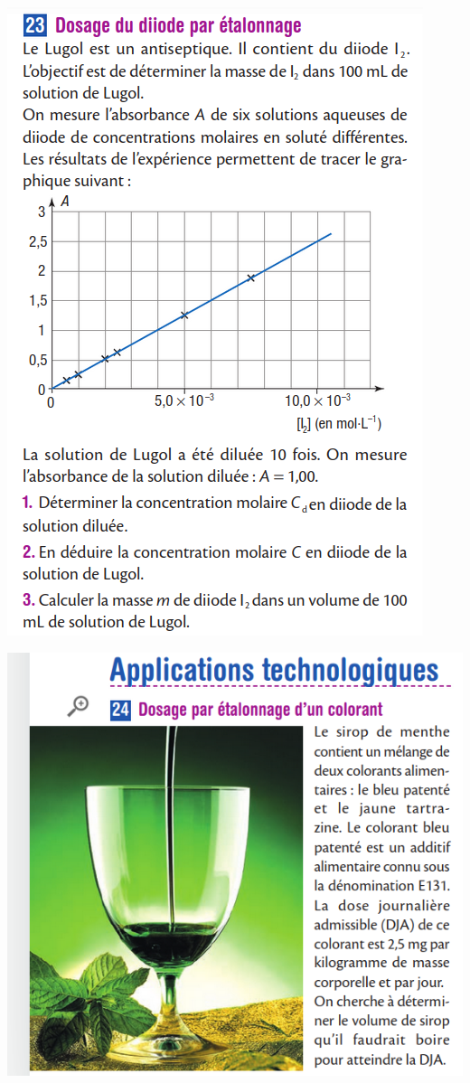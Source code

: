 \documentclass[10pt]{article}
\newcommand{\myscale}{0.41}
\begin{document}
\begin{center}
\begin{minipage}[c]{0.45\textwidth}
		\includegraphics[scale=\myscale]{assets/23.png}




	\end{minipage}


	\begin{minipage}[c]{0.45\textwidth}
		\centering
		\includegraphics[scale=\myscale]{assets/24a.png}


\end{minipage}
\end{center}
\end{document}
